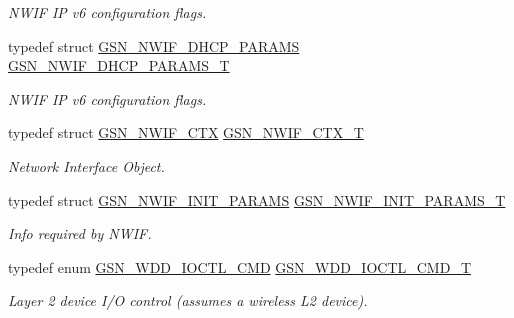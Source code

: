 \begin{DoxyCompactItemize}
\begin{DoxyCompactList}\small\item\em NWIF IP v6 configuration flags. \end{DoxyCompactList}\item 
typedef struct \hyperlink{a00168}{GSN\_\-NWIF\_\-DHCP\_\-PARAMS} \hyperlink{a00670_ga9f9d4b76c96f7c8444291e1706c4fcff}{GSN\_\-NWIF\_\-DHCP\_\-PARAMS\_\-T}
\begin{DoxyCompactList}\small\item\em NWIF IP v6 configuration flags. \end{DoxyCompactList}\item 
typedef struct \hyperlink{a00167}{GSN\_\-NWIF\_\-CTX} \hyperlink{a00670_ga47d94474618770f1d7c6ef6b783b9d24}{GSN\_\-NWIF\_\-CTX\_\-T}
\begin{DoxyCompactList}\small\item\em Network Interface Object. \end{DoxyCompactList}\item 
typedef struct \hyperlink{a00169}{GSN\_\-NWIF\_\-INIT\_\-PARAMS} \hyperlink{a00670_gaa7bcca8daa18d56c6d5f107fc3523370}{GSN\_\-NWIF\_\-INIT\_\-PARAMS\_\-T}
\begin{DoxyCompactList}\small\item\em Info required by NWIF. \end{DoxyCompactList}\item 
typedef enum \hyperlink{a00670_gaf67ac3e77c7a5742b9b0bc7672529533}{GSN\_\-WDD\_\-IOCTL\_\-CMD} \hyperlink{a00670_ga0c5055a50e14741ff0accb7d8d5bf039}{GSN\_\-WDD\_\-IOCTL\_\-CMD\_\-T}
\begin{DoxyCompactList}\small\item\em Layer 2 device I/O control (assumes a wireless L2 device). \end{DoxyCompactList}\end{DoxyCompactItemize}
